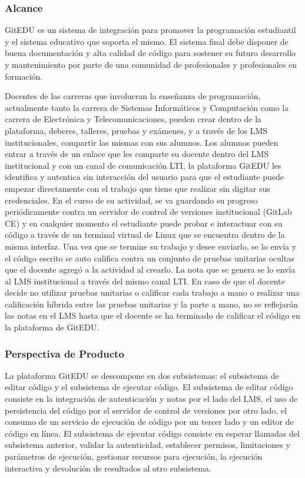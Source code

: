 \subsubsection{Alcance}
GitEDU es un sistema de integración para promover la programación estudiantil y el sistema educativo que soporta el mismo. El sistema final debe disponer de buena documentación y alta calidad de código para sostener su futuro desarrollo y mantenimiento por parte de una comunidad de profesionales y profesionales en formación.

Docentes de las carreras que involucran la enseñanza de programación, actualmente tanto la carrera de Sistemas Informáticos y Computación como la carrera de Electrónica y Telecomunicaciones, pueden crear dentro de la plataforma, deberes, talleres, pruebas y exámenes, y a través de los LMS institucionales, compartir las mismas con sus alumnos. Los alumnos pueden entrar a través de un enlace que les comparte su docente dentro del LMS institucional y con un canal de comunicación LTI, la plataforma GitEDU les identifica y autentica sin interacción del usuario para que el estudiante puede empezar directamente con el trabajo que tiene que realizar sin digitar sus credenciales. En el curso de su actividad, se va guardando su progreso periódicamente contra un servidor de control de versiones institucional (GitLab CE) y en cualquier momento el estudiante puede probar e interactuar con su código a través de un terminal virtual de Linux que se encuentra dentro de la misma interfaz. Una vez que se termine su trabajo y desee enviarlo, se lo envía y el código escrito se auto califica contra un conjunto de pruebas unitarias ocultas que el docente agregó a la actividad al crearlo. La nota que se genera se lo envía al LMS institucional a través del mismo canal LTI. En caso de que el docente decide no utilizar pruebas unitarias o calificar cada trabajo a mano o realizar una calificación híbrida entre las pruebas unitarias y la parte a mano, no se reflejarán las notas en el LMS hasta que el docente se ha terminado de calificar el código en la plataforma de GitEDU.

\subsubsection{Perspectiva de Producto}
La plataforma GitEDU se descompone en dos subsistemas: el subsistema de editar código y el subsistema de ejecutar código. El subsistema de editar código consiste en la integración de autenticación y notas por el lado del LMS, el uso de persistencia del código por el servidor de control de versiones por otro lado, el consumo de un servicio de ejecución de código por un tercer lado y un editor de código en línea. El subsistema de ejecutar código consiste en esperar llamadas del subsistema anterior, validar la autenticidad, establecer permisos, limitaciones y parámetros de ejecución, gestionar recursos para ejecución, la ejecución interactiva y devolución de resultados al otro subsistema.

